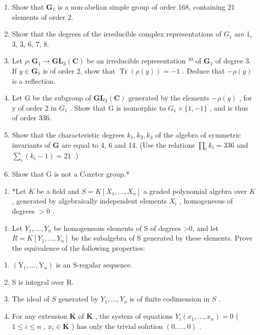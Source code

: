 \begin{enumerate}
\def\labelenumi{\alph{enumi})}
\item
  Show that \(\mathbf{G}_1\) is a non-abelian simple group of order 168, containing 21 elements of order 2.
\item
  Show that the degrees of the irreducible complex representations of \(G_{1}\) are 1, 3, 3, 6, 7, 8.
\item
  Let \(\rho: \mathbf{G}_1 \to \mathbf{GL}_3(\mathbf{C})\) be an irreducible representation \(^{10}\) of \(\mathbf{G}_1\) of degree 3. If \(y \in \mathbf{G}_1\) is of order 2, show that \(\operatorname{Tr}(\rho(y)) = -1\) . Deduce that \(-\rho(y)\) is a reflection.
\item
  Let G be the subgroup of \(\mathbf{GL}_{3}(\mathbf{C})\) generated by the elements \(-\rho(y)\) , for y of order 2 in \(G_{1}\) . Show that G is isomorphic to \(G_{1} \times \{1, -1\}\) , and is thus of order 336.
\item
  Show that the characteristic degrees \(k_{1}, k_{2}, k_{3}\) of the algebra of symmetric invariants of \(\mathbf{G}\) are equal to 4, 6 and 14. (Use the relations \(\prod_{i} k_{i} = 336\) and \(\sum_{i} (k_{i} - 1) = 21\) .)
\item
  Show that G is not a Coxeter group.*
\end{enumerate}

\begin{enumerate}
\def\labelenumi{\arabic{enumi})}
\setcounter{enumi}{4}
\tightlist
\item
  *Let \(K\) be a field and \(S = K[X_1, \ldots, X_n]\) a graded polynomial algebra over \(K\) , generated by algebraically independent elements \(X_i\) , homogeneous of degrees \(> 0\) .
\end{enumerate}

\begin{enumerate}
\def\labelenumi{\alph{enumi})}
\tightlist
\item
  Let \(Y_{1},\ldots,Y_{n}\) be homogeneous elements of S of degrees \textgreater0, and let \(R = K[Y_{1},\ldots,Y_{n}]\) be the subalgebra of S generated by these elements. Prove the equivalence of the following properties:
\end{enumerate}

\begin{enumerate}
\def\labelenumi{(\roman{enumi})}
\item
  \((\mathrm{Y}_1,\dots ,\mathrm{Y}_n)\) is an S-regular sequence.
\item
  S is integral over R.
\item
  The ideal of \(S\) generated by \(Y_{1},\ldots ,Y_{n}\) is of finite codimension in \(S\) .
\item
  For any extension \(\overline{\mathbf{K}}\) of \(\mathbf{K}\) , the system of equations \(Y_{i}(x_{1},\ldots ,x_{n}) = 0\) ( \(1\leqslant i\leqslant n\) , \(x_{i}\in \overline{\mathbf{K}}\) ) has only the trivial solution \((0,\dots ,0)\) .
\end{enumerate}

